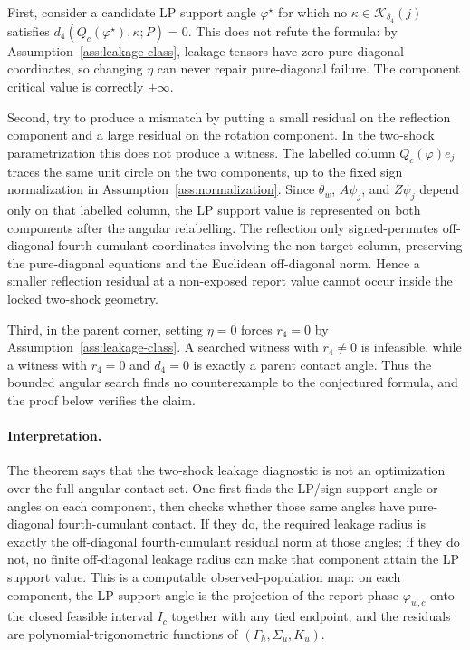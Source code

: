 First, consider a candidate LP support angle \(\varphi^\star\) for which no \(\kappa\in\mathcal K_{\delta_4}(j)\) satisfies \(d_4(Q_c(\varphi^\star),\kappa;P)=0\).  This does not refute the formula: by Assumption~\ref{ass:leakage-class}, leakage tensors have zero pure diagonal coordinates, so changing \(\eta\) can never repair pure-diagonal failure.  The component critical value is correctly \(+\infty\).

Second, try to produce a mismatch by putting a small residual on the reflection component and a large residual on the rotation component.  In the two-shock parametrization this does not produce a witness.  The labelled column \(Q_c(\varphi)e_j\) traces the same unit circle on the two components, up to the fixed sign normalization in Assumption~\ref{ass:normalization}.  Since \(\theta_w\), \(A\psi_j\), and \(Z\psi_j\) depend only on that labelled column, the LP support value is represented on both components after the angular relabelling.  The reflection only signed-permutes off-diagonal fourth-cumulant coordinates involving the non-target column, preserving the pure-diagonal equations and the Euclidean off-diagonal norm.  Hence a smaller reflection residual at a non-exposed report value cannot occur inside the locked two-shock geometry.

Third, in the parent corner, setting \(\eta=0\) forces \(r_4=0\) by Assumption~\ref{ass:leakage-class}.  A searched witness with \(r_4\ne0\) is infeasible, while a witness with \(r_4=0\) and \(d_4=0\) is exactly a parent contact angle.  Thus the bounded angular search finds no counterexample to the conjectured formula, and the proof below verifies the claim.

\paragraph{Interpretation.}
The theorem says that the two-shock leakage diagnostic is not an optimization over the full angular contact set.  One first finds the LP/sign support angle or angles on each component, then checks whether those same angles have pure-diagonal fourth-cumulant contact.  If they do, the required leakage radius is exactly the off-diagonal fourth-cumulant residual norm at those angles; if they do not, no finite off-diagonal leakage radius can make that component attain the LP support value.  This is a computable observed-population map: on each component, the LP support angle is the projection of the report phase \(\varphi_{w,c}\) onto the closed feasible interval \(I_c\) together with any tied endpoint, and the residuals are polynomial-trigonometric functions of \((\Gamma_h,\Sigma_u,K_u)\).

